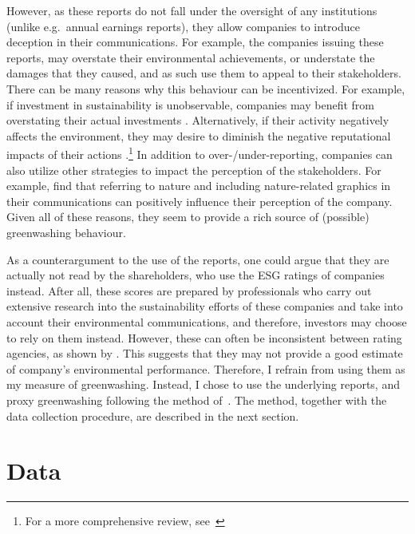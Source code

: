 \documentclass[12pt]{article}
\begin{document}
However, as these reports do not fall under the oversight of any institutions (unlike e.g.~annual earnings reports), they allow companies to introduce deception in their communications. For example, the companies issuing these reports, may overstate their environmental achievements, or understate the damages that they caused, and as such use them to appeal to their stakeholders. There can be many reasons why this behaviour can be incentivized. For example, if investment in sustainability is unobservable, companies may benefit from overstating their actual investments \parencite{wuBadGreenwashingGood2020}. Alternatively, if their activity negatively affects the environment, they may desire to diminish the negative reputational impacts of their actions \parencite{marquisScrutinyNormsSelective2016, binglerCheapTalkCherrypicking2022}.\footnote{For a more comprehensive review, see~\cite{kimGreenwashVsBrownwash2015}} In addition to over-/under-reporting, companies can also utilize other strategies to impact the perception of the stakeholders. For example, \textcite{parguelCanEvokingNature2015,schmuckMisleadingConsumersGreen2018} find that referring to nature and including nature-related graphics in their communications can positively influence their perception of the company. Given all of these reasons, they seem to provide a rich source of (possible) greenwashing behaviour.


As a counterargument to the use of the reports, one could argue that they are actually not read by the shareholders, who use the ESG ratings of companies instead. After all, these scores are prepared by professionals who carry out extensive research into the sustainability efforts of these companies and take into account their environmental communications, and therefore, investors may choose to rely on them instead. However, these can often be inconsistent between rating agencies, as shown by \textcite{bergAggregateConfusionDivergence2022, chatterjiRatingsFirmsConverge2016}. This suggests that they may not provide a good estimate of company's environmental performance. Therefore, I refrain from using them as my measure of greenwashing. Instead, I chose to use the underlying reports, and proxy greenwashing following the method of~\cite{binglerHowCheapTalk2024}. The method, together with the data collection procedure, are described in the next section.


\section{Data}\label{sect:data}
\end{document}

